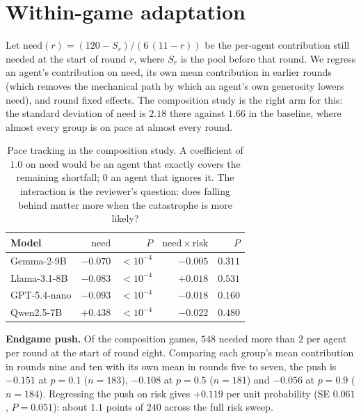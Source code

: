 \documentclass[11pt,a4paper]{article}
\begin{document}
\section{Within-game adaptation}
\label{sec:pace}

Let $\mathrm{need}(r)=(120-S_r)/(6\,(11-r))$ be the per-agent contribution still needed
at the start of round $r$, where $S_r$ is the pool before that round. We regress an
agent's contribution on $\mathrm{need}$, its own mean contribution in earlier rounds
(which removes the mechanical path by which an agent's own generosity lowers
$\mathrm{need}$), and round fixed effects. The composition study is the right arm for
this: the standard deviation of $\mathrm{need}$ is $2.18$ there against $1.66$ in the
baseline, where almost every group is on pace at almost every round.

\begin{table}[h]
\centering
\caption{Pace tracking in the composition study. A coefficient of $1.0$ on
$\mathrm{need}$ would be an agent that exactly covers the remaining shortfall; $0$ an
agent that ignores it. The interaction is the reviewer's question: does falling behind
matter more when the catastrophe is more likely?}
\begin{tabular}{@{}lrrrr@{}}
\toprule
Model & $\mathrm{need}$ & $P$ & $\mathrm{need}\times\mathrm{risk}$ & $P$ \\
\midrule
Gemma-2-9B    & $-0.070$ & $<10^{-4}$ & $-0.005$ & $0.311$ \\
Llama-3.1-8B  & $-0.083$ & $<10^{-4}$ & $+0.018$ & $0.531$ \\
GPT-5.4-nano  & $-0.093$ & $<10^{-4}$ & $-0.018$ & $0.160$ \\
Qwen2.5-7B    & $+0.438$ & $<10^{-4}$ & $-0.022$ & $0.480$ \\
\bottomrule
\end{tabular}
\end{table}

\noindent \textbf{Endgame push.} Of the composition games, $548$ needed more than $2$
per agent per round at the start of round eight. Comparing each group's mean
contribution in rounds nine and ten with its own mean in rounds five to seven, the push
is $-0.151$ at $p=0.1$ ($n=183$), $-0.108$ at $p=0.5$ ($n=181$) and $-0.056$ at $p=0.9$
($n=184$). Regressing the push on risk gives $+0.119$ per unit probability (SE $0.061$,
$P=0.051$): about $1.1$ points of $240$ across the full risk sweep.
\end{document}
